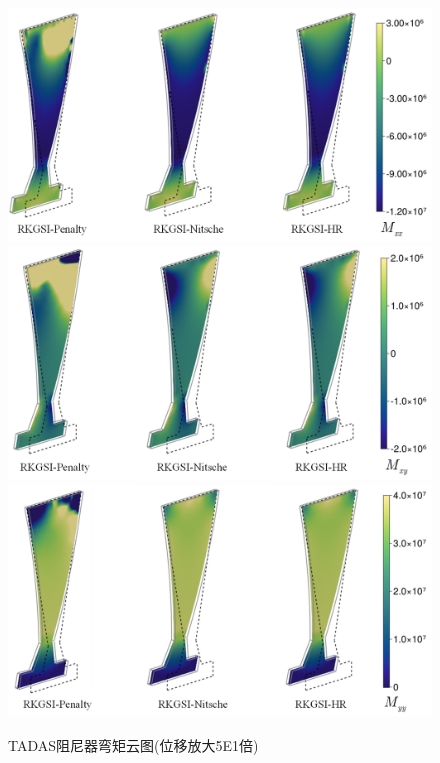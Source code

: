 \begin{figure}[H]
    \centering
        \includegraphics[scale=0.5]{figure/DAMPER/TADAS/M11.png}
        \includegraphics[scale=0.5]{figure/DAMPER/TADAS/M12.png}
        \includegraphics[scale=0.5]{figure/DAMPER/TADAS/M22.png}
    \caption{TADAS阻尼器弯矩云图(位移放大5E1倍)}\label{TADASM}
\end{figure}


